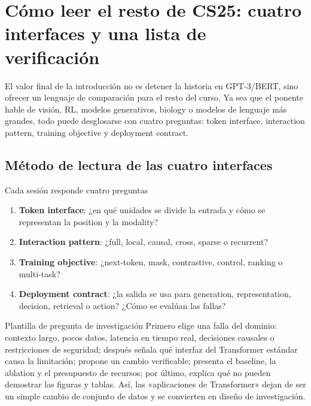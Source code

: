 \section{Cómo leer el resto de CS25: cuatro interfaces y una lista de verificación}

El valor final de la introducción no es detener la historia en GPT-3/BERT, sino ofrecer un lenguaje de comparación para el resto del curso. Ya sea que el ponente hable de visión, RL, modelos generativos, biology o modelos de lenguaje más grandes, todo puede desglosarse con cuatro preguntas: token interface, interaction pattern, training objective y deployment contract.

\subsection{Método de lectura de las cuatro interfaces}

\begin{importantbox}{Cada sesión responde cuatro preguntas}
\begin{enumerate}
  \item \textbf{Token interface}: ¿en qué unidades se divide la entrada y cómo se representan la position y la modality?
  \item \textbf{Interaction pattern}: ¿full, local, causal, cross, sparse o recurrent?
  \item \textbf{Training objective}: ¿next-token, mask, contrastive, control, ranking o multi-task?
  \item \textbf{Deployment contract}: ¿la salida se usa para generation, representation, decision, retrieval o action? ¿Cómo se evalúan las fallas?
\end{enumerate}
\end{importantbox}


\begin{knowledgebox}{Plantilla de pregunta de investigación}
Primero elige una falla del dominio: contexto largo, pocos datos, latencia en tiempo real, decisiones causales o restricciones de seguridad; después señala qué interfaz del Transformer estándar causa la limitación; propone un cambio verificable; presenta el baseline, la ablation y el presupuesto de recursos; por último, explica qué no pueden demostrar las figuras y tablas. Así, las «aplicaciones de Transformer» dejan de ser un simple cambio de conjunto de datos y se convierten en diseño de investigación.
\end{knowledgebox}

